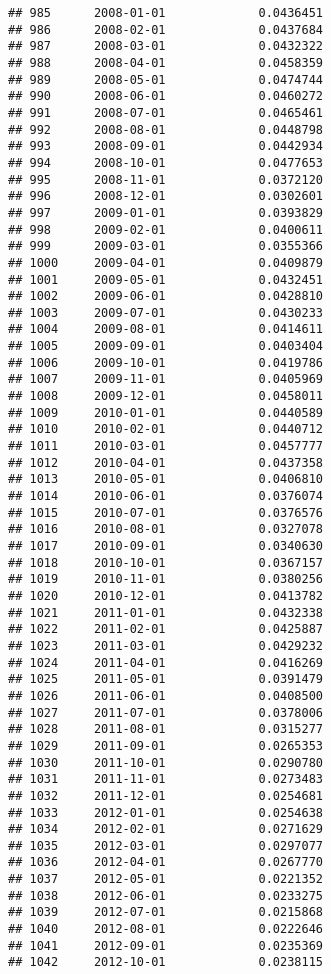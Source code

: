 \documentclass[
]{article}
\begin{document}
\begin{verbatim}
## 985      2008-01-01             0.0436451
## 986      2008-02-01             0.0437684
## 987      2008-03-01             0.0432322
## 988      2008-04-01             0.0458359
## 989      2008-05-01             0.0474744
## 990      2008-06-01             0.0460272
## 991      2008-07-01             0.0465461
## 992      2008-08-01             0.0448798
## 993      2008-09-01             0.0442934
## 994      2008-10-01             0.0477653
## 995      2008-11-01             0.0372120
## 996      2008-12-01             0.0302601
## 997      2009-01-01             0.0393829
## 998      2009-02-01             0.0400611
## 999      2009-03-01             0.0355366
## 1000     2009-04-01             0.0409879
## 1001     2009-05-01             0.0432451
## 1002     2009-06-01             0.0428810
## 1003     2009-07-01             0.0430233
## 1004     2009-08-01             0.0414611
## 1005     2009-09-01             0.0403404
## 1006     2009-10-01             0.0419786
## 1007     2009-11-01             0.0405969
## 1008     2009-12-01             0.0458011
## 1009     2010-01-01             0.0440589
## 1010     2010-02-01             0.0440712
## 1011     2010-03-01             0.0457777
## 1012     2010-04-01             0.0437358
## 1013     2010-05-01             0.0406810
## 1014     2010-06-01             0.0376074
## 1015     2010-07-01             0.0376576
## 1016     2010-08-01             0.0327078
## 1017     2010-09-01             0.0340630
## 1018     2010-10-01             0.0367157
## 1019     2010-11-01             0.0380256
## 1020     2010-12-01             0.0413782
## 1021     2011-01-01             0.0432338
## 1022     2011-02-01             0.0425887
## 1023     2011-03-01             0.0429232
## 1024     2011-04-01             0.0416269
## 1025     2011-05-01             0.0391479
## 1026     2011-06-01             0.0408500
## 1027     2011-07-01             0.0378006
## 1028     2011-08-01             0.0315277
## 1029     2011-09-01             0.0265353
## 1030     2011-10-01             0.0290780
## 1031     2011-11-01             0.0273483
## 1032     2011-12-01             0.0254681
## 1033     2012-01-01             0.0254638
## 1034     2012-02-01             0.0271629
## 1035     2012-03-01             0.0297077
## 1036     2012-04-01             0.0267770
## 1037     2012-05-01             0.0221352
## 1038     2012-06-01             0.0233275
## 1039     2012-07-01             0.0215868
## 1040     2012-08-01             0.0222646
## 1041     2012-09-01             0.0235369
## 1042     2012-10-01             0.0238115

\end{verbatim}
\end{document}
